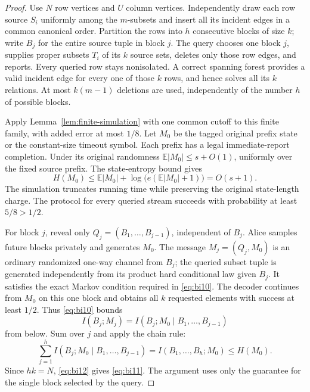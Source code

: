 \documentclass[11pt,letterpaper]{article}
\numberwithin{equation}{section}
\newcommand{\E}{\mathbb E}
\begin{document}
\begin{proof}
Use $N$ row vertices and $U$ column vertices.
Independently draw each row source $S_i$ uniformly among the $m$-subsets and insert all its incident edges in a common canonical order.
Partition the rows into $h$ consecutive blocks of size $k$; write $B_j$ for the entire source tuple in block $j$.
The query chooses one block $j$, supplies proper subsets $T_i$ of its $k$ source sets, deletes only those row edges, and reports.
Every queried row stays nonisolated.
A correct spanning forest provides a valid incident edge for every one of those $k$ rows, and hence solves all its $k$ relations.
At most $k(m-1)$ deletions are used, independently of the number $h$ of possible blocks.

Apply Lemma~\ref{lem:finite-simulation} with one common cutoff to this finite family, with added error at most $1/8$.
Let $M_0$ be the tagged original prefix state or the constant-size timeout symbol.
Each prefix has a legal immediate-report completion.
Under its original randomness $\E|M_0|\le s+O(1)$, uniformly over the fixed source prefix.
The state-entropy bound gives
\begin{equation}
H(M_0)\le \E|M_0|+
   \log\bigl(e(\E|M_0|+1)\bigr)=O(s+1).
 \label{eq:bi12}
\end{equation}
The simulation truncates running time while preserving the original state-length charge.
The protocol for every queried stream succeeds with probability at least $5/8>1/2$.

For block $j$, reveal only $Q_j=(B_1,\ldots,B_{j-1})$, independent of $B_j$.
Alice samples future blocks privately and generates $M_0$.
The message $M_j=(Q_j,M_0)$ is an ordinary randomized one-way channel from $B_j$; the queried subset tuple is generated independently from its product hard conditional law given $B_j$.
It satisfies the exact Markov condition required in \eqref{eq:bi10}.
The decoder continues from $M_0$ on this one block and obtains all $k$ requested elements with success at least $1/2$.
Thus \eqref{eq:bi10} bounds
\[
 I(B_j;M_j)=I(B_j;M_0\mid B_1,\ldots,B_{j-1})
\]
from below.
Sum over $j$ and apply the chain rule:
\[
 \sum_{j=1}^h I(B_j;M_0\mid B_1,\ldots,B_{j-1})
 =I(B_1,\ldots,B_h;M_0)\le H(M_0).
\]
Since $hk=N$, \eqref{eq:bi12} gives \eqref{eq:bi11}.
The argument uses only the guarantee for the single block selected by the query.
\end{proof}
\end{document}
